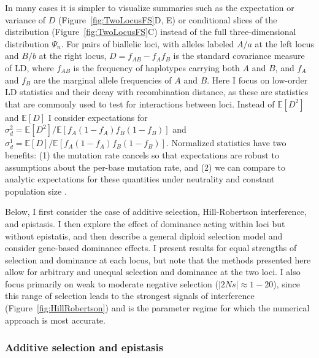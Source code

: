 \documentclass[]{article}
\newcommand{\E}{\mathbb{E}}
\begin{document}
In many cases it is simpler to visualize summaries such as the expectation or
variance of \(D\) (Figure~\ref{fig:TwoLocusFS}D, E) or conditional slices of
the distribution (Figure~\ref{fig:TwoLocusFS}C) instead of the full
three-dimensional distribution \(\Psi_n\). For pairs of biallelic loci, with
alleles labeled \(A/a\) at the left locus and \(B/b\) at the right locus,
\(D=f_{AB}-f_A f_B\) is the standard covariance measure of LD, where \(f_{AB}\)
is the frequency of haplotypes carrying both \(A\) and \(B\), and \(f_A\) and
\(f_B\) are the marginal allele frequencies of \(A\) and \(B\). Here I focus on
low-order LD statistics and their decay with recombination distance, as these
are statistics that are commonly used to test for interactions between loci.
Instead of \(\E[D^2]\) and \(\E[D]\) I consider expectations for \(\sigma_d^2 =
\E[D^2]/\E[f_A(1-f_A)f_B(1-f_B)]\) and \(\sigma_d^1 =
\E[D]/\E[f_A(1-f_A)f_B(1-f_B)]\). Normalized statistics have two benefits: (1)
the mutation rate cancels so that expectations are robust to assumptions about
the per-base mutation rate, and (2) we can compare to analytic expectations for
these quantities under neutrality and constant population size
\citep{Ohta1971-yd}.

Below, I first consider the case of additive selection, Hill-Robertson
interference, and epistasis. I then explore the effect of dominance acting
within loci but without epistatis, and then describe a general diploid
selection model and consider gene-based dominance effects. I present results
for equal strengths of selection and dominance at each locus, but note that the
methods presented here allow for arbitrary and unequal selection and dominance
at the two loci. I also focus primarily on weak to moderate negative selection
(\(|2Ns| \approx 1 - 20\)), since this range of selection leads to the
strongest signals of interference (Figure~\ref{fig:HillRobertson}) and is the
parameter regime for which the numerical approach is most accurate.

\subsubsection{Additive selection and epistasis}
\label{sec:additive-selection}
\end{document}
